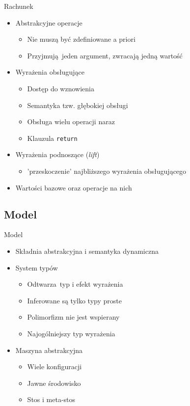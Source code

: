 \documentclass{beamer}
\begin{document}
\begin{frame}{Rachunek}
  \begin{itemize}
    \item Abstrakcyjne operacje
    \begin{itemize}
      \pause
      \item Nie muszą być zdefiniowane a priori
      \pause
      \item Przyjmują jeden argument, zwracają jedną wartość
    \end{itemize}
    \pause
    \item Wyrażenia obsługujące
    \begin{itemize}
      \pause
      \item Dostęp do wznowienia
      \pause
      \item Semantyka tzw. głębokiej obsługi
      \pause
      \item Obsługa wielu operacji naraz
      \pause
      \item Klauzula \texttt{return}
    \end{itemize}
    \pause
    \item Wyrażenia podnoszące (\emph{lift})
    \begin{itemize}
      \pause
      \item 'przeskoczenie' najbliższego wyrażenia obsługującego
    \end{itemize}
    \pause
    \item Wartości bazowe oraz operacje na nich
  \end{itemize}
\end{frame}

\subsection{Model}
\begin{frame}{Model}
  \begin{itemize}
    \item Składnia abstrakcyjna i semantyka dynamiczna
    \pause
    \item System typów
    \begin{itemize}
      \item Odtwarza typ i efekt wyrażenia
      \pause
      \item Inferowane są tylko typy proste
      \pause
      \item Polimorfizm nie jest wspierany
      \pause
      \item Najogólniejszy typ wyrażenia
    \end{itemize}
    \pause
    \item Maszyna abstrakcyjna
    \begin{itemize}
      \pause
      \item Wiele konfiguracji
      \pause
      \item Jawne środowisko
      \pause
      \item Stos i meta-stos
    \end{itemize}
  \end{itemize}
\end{frame}
\end{document}

